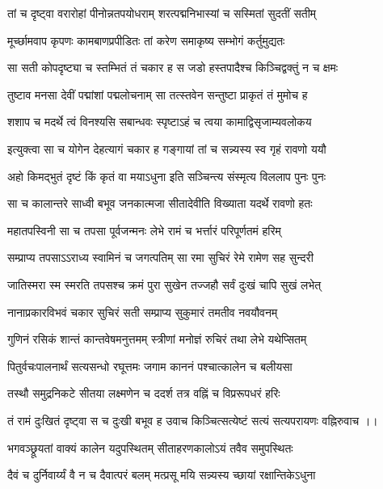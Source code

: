 \twolineshloka
{तां च दृष्ट्वा वरारोहां पीनोन्नतपयोधराम्}
{शरत्पद्मनिभास्यां च सस्मितां सुदतीं सतीम्}%

\twolineshloka
{मूर्च्छामवाप कृपणः कामबाणप्रपीडितः}
{तां करेण समाकृष्य सम्भोगं कर्तुमुद्यतः}%

\twolineshloka
{सा सती कोपदृष्ट्या च स्तम्भितं तं चकार ह}
{स जडो हस्तपादैश्च किञ्चिद्वक्तुं न च क्षमः}%

\twolineshloka
{तुष्टाव मनसा देवीं पद्मांशां पद्मलोचनाम्}
{सा तत्स्तवेन सन्तुष्टा प्राकृतं तं मुमोच ह}%

\twolineshloka
{शशाप च मदर्थे त्वं विनश्यसि सबान्धवः}
{स्पृष्टाऽहं च त्वया कामाद्विसृजाम्यवलोकय}%

\twolineshloka
{इत्युक्त्वा सा च योगेन देहत्यागं चकार ह}
{गङ्गायां तां च सन्न्यस्य स्व गृहं रावणो ययौ}%

\twolineshloka
{अहो किमद्भुतं दृष्टं किं कृतं वा मयाऽधुना}
{इति सञ्चिन्त्य संस्मृत्य विललाप पुनः पुनः}%

\twolineshloka
{सा च कालान्तरे साध्वी बभूव जनकात्मजा}
{सीतादेवीति विख्याता यदर्थे रावणो हतः}%

\twolineshloka
{महातपस्विनी सा च तपसा पूर्वजन्मनः}
{लेभे रामं च भर्त्तारं परिपूर्णतमं हरिम्}%

\twolineshloka
{सम्प्राप्य तपसाऽऽराध्य स्वामिनं च जगत्पतिम्}
{सा रमा सुचिरं रेमे रामेण सह सुन्दरी}%

\twolineshloka
{जातिस्मरा स्म स्मरति तपसश्च क्रमं पुरा}
{सुखेन तज्जहौ सर्वं दुःखं चापि सुखं लभेत्}%

\twolineshloka
{नानाप्रकारविभवं चकार सुचिरं सती}
{सम्प्राप्य सुकुमारं तमतीव नवयौवनम्}%

\twolineshloka
{गुणिनं रसिकं शान्तं कान्तवेषमनुत्तमम्}
{स्त्रीणां मनोज्ञं रुचिरं तथा लेभे यथेप्सितम्}%

\twolineshloka
{पितुर्वचःपालनार्थं सत्यसन्धो रघूत्तमः}
{जगाम काननं पश्चात्कालेन च बलीयसा}%

\twolineshloka
{तस्थौ समुद्रनिकटे सीतया लक्ष्मणेन च}
{ददर्श तत्र वह्निं च विप्ररूपधरं हरिः}%

\twolineshloka
{तं रामं दुःखितं दृष्ट्वा स च दुःखी बभूव ह}
{उवाच किञ्चित्सत्येष्टं सत्यं सत्यपरायणः}%
वह्निरुवाच ।।

\twolineshloka
{भगवञ्छ्रूयतां वाक्यं कालेन यदुपस्थितम्}
{सीताहरणकालोऽयं तवैव समुपस्थितः}%

\twolineshloka
{दैवं च दुर्निवार्य्यं वै न च दैवात्परं बलम्}
{मत्प्रसू मयि सन्न्यस्य च्छायां रक्षान्तिकेऽधुना}%

